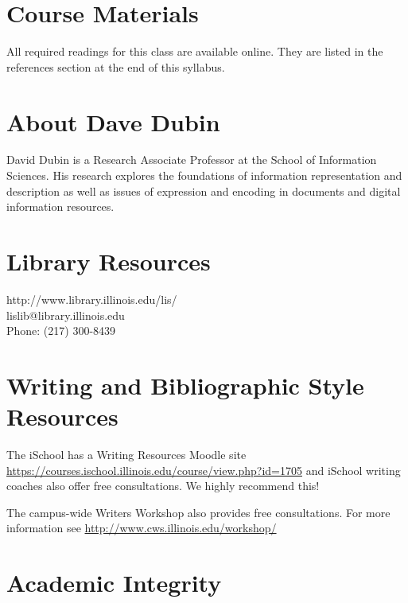 \documentclass[]{article}
\begin{document}
\section{Course Materials}\label{course-materials}

All required readings for this class are available online. They are
listed in the references section at the end of this syllabus.

\section{About Dave Dubin}\label{about-dave-dubin}

David Dubin is a Research Associate Professor at the School of
Information Sciences. His research explores the foundations of
information representation and description as well as issues of
expression and encoding in documents and digital information resources.

\section{Library Resources}\label{library-resources}

http://www.library.illinois.edu/lis/\\
lislib@library.illinois.edu\\
Phone: (217) 300-8439

\section{Writing and Bibliographic Style
Resources}\label{writing-and-bibliographic-style-resources}

The iSchool has a Writing Resources Moodle site
\url{https://courses.ischool.illinois.edu/course/view.php?id=1705} and
iSchool writing coaches also offer free consultations. We highly
recommend this!

The campus-wide Writers Workshop also provides free consultations. For
more information see \url{http://www.cws.illinois.edu/workshop/}

\section{Academic Integrity}\label{academic-integrity}
\end{document}
